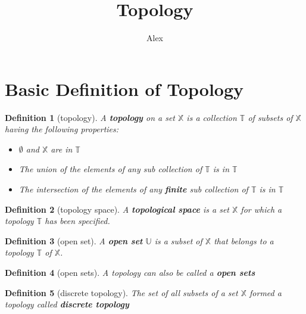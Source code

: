 \documentclass[twoside]{article}
\title{Topology}
\author{Alex}
\newtheorem{definition}{Definition}[section]
\begin{document}
      \tableofcontents

      \section{Basic Definition of Topology}

            \begin{definition}[topology]
                  A \textit{\textbf{topology}} on a set $ \mathbb{X} $ is a collection $ \mathbb{T} $ of subsets of $ \mathbb{X} $ having the following properties:

                  \begin{itemize}
                        \item $ \emptyset $ and $ \mathbb{X} $ are in $ \mathbb{T} $
                        \item The union of the elements of any sub collection of $ \mathbb{T} $ is in $ \mathbb{T} $
                        \item The intersection of the elements of any \textbf{finite} sub collection of $ \mathbb{T} $ is in $ \mathbb{T} $
                  \end{itemize} 
            \end{definition}

            \begin{definition}[topology space]
                  A \textit{\textbf{topological space}} is a set $ \mathbb{X} $ for which a topology $ \mathbb{T} $ has been specified.
            \end{definition}
            
            \begin{definition}[open set]
                  A \textit{\textbf{open set}} $ \mathbb{U} $ is a subset of $ \mathbb{X} $ that belongs to a topology $ \mathbb{T} $ of $ \mathbb{X} $.
            \end{definition}
            
            \begin{definition}[open sets]
                  A topology can also be called a \textit{\textbf{open sets}}
            \end{definition}

            \begin{definition}[discrete topology]
                  The set of all subsets of a set $ \mathbb{X} $ formed a topology called \textit{\textbf{discrete topology}}
            \end{definition}
\end{document}
